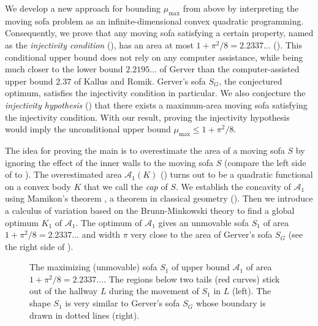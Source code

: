 We develop a new approach for bounding \(\mu_{\max}\) from above by interpreting the moving sofa problem as an infinite-dimensional convex quadratic programming. Consequently, we prove that any moving sofa satisfying a certain property, named as the \emph{injectivity condition} (), has an area at most \(1 + \pi^2/8 = 2.2337\dots\) (). This conditional upper bound does not rely on any computer assistance, while being much closer to the lower bound \(2.2195\dots\) of Gerver than the computer-assisted upper bound \(2.37\) of Kallus and Romik. Gerver’s sofa \(S_G\), the conjectured optimum, satisfies the injectivity condition in particular. We also conjecture the \emph{injectivity hypothesis} () that there exists a maximum-area moving sofa satisfying the injectivity condition. With our result, proving the injectivity hypothesis would imply the unconditional upper bound \(\mu_{\max} \leq 1 + \pi^2/8\).

The idea for proving the main  is to overestimate the area of a moving sofa \(S\) by ignoring the effect of the inner walls to the moving sofa \(S\) (compare the left side of  to ). The overestimated area \(\mathcal{A}_1(K)\) () turns out to be a quadratic functional on a convex body \(K\) that we call the \emph{cap} of \(S\). We establish the concavity of \(\mathcal{A}_1\) using Mamikon’s theorem \autocite{mnatsakanianAnnularRingsEqual1997}, a theorem in classical geometry (). Then we introduce a calculus of variation based on the Brunn-Minkowski theory to find a global optimum \(K_1\) of \(\mathcal{A}_1\). The optimum of \(\mathcal{A}_1\) gives an unmovable sofa \(S_1\) of area \(1 + \pi^2/8 = 2.2337\dots\) and width \(\pi\) very close to the area of Gerver’s sofa \(S_G\) (see the right side of ).

\begin{figure}
\centering

\caption{The maximizing (unmovable) sofa \(S_1\) of upper bound \(\mathcal{A}_1\) of area \(1 + \pi^2/8 = 2.2337\dots\). The regions below two tails (red curves) stick out of the hallway \(L\) during the movement of \(S_1\) in \(L\) (left). The shape \(S_1\) is very similar to Gerver’s sofa \(S_G\) whose boundary is drawn in dotted lines (right).}
\label{fig:presofa}
\end{figure}